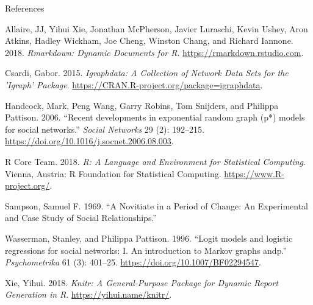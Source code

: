 \documentclass[10pt,ignorenonframetext,handout,aspectratio=169,]{beamer}
\begin{document}
\begin{frame}[allowframebreaks]{References}
\protect\hypertarget{references}{}

\hypertarget{refs}{}
\leavevmode\hypertarget{ref-rmarkdown}{}%
Allaire, JJ, Yihui Xie, Jonathan McPherson, Javier Luraschi, Kevin
Ushey, Aron Atkins, Hadley Wickham, Joe Cheng, Winston Chang, and
Richard Iannone. 2018. \emph{Rmarkdown: Dynamic Documents for R}.
\url{https://rmarkdown.rstudio.com}.

\leavevmode\hypertarget{ref-Csardi2015}{}%
Csardi, Gabor. 2015. \emph{Igraphdata: A Collection of Network Data Sets
for the 'Igraph' Package}.
\url{https://CRAN.R-project.org/package=igraphdata}.

\leavevmode\hypertarget{ref-Handcock2006}{}%
Handcock, Mark, Peng Wang, Garry Robins, Tom Snijders, and Philippa
Pattison. 2006. ``Recent developments in exponential random graph (p*)
models for social networks.'' \emph{Social Networks} 29 (2): 192--215.
\url{https://doi.org/10.1016/j.socnet.2006.08.003}.

\leavevmode\hypertarget{ref-R}{}%
R Core Team. 2018. \emph{R: A Language and Environment for Statistical
Computing}. Vienna, Austria: R Foundation for Statistical Computing.
\url{https://www.R-project.org/}.

\leavevmode\hypertarget{ref-sampson1969novitiate}{}%
Sampson, Samuel F. 1969. ``A Novitiate in a Period of Change: An
Experimental and Case Study of Social Relationships.''

\leavevmode\hypertarget{ref-Wasserman1996}{}%
Wasserman, Stanley, and Philippa Pattison. 1996. ``Logit models and
logistic regressions for social networks: I. An introduction to Markov
graphs andp.'' \emph{Psychometrika} 61 (3): 401--25.
\url{https://doi.org/10.1007/BF02294547}.

\leavevmode\hypertarget{ref-knitr}{}%
Xie, Yihui. 2018. \emph{Knitr: A General-Purpose Package for Dynamic
Report Generation in R}. \url{https://yihui.name/knitr/}.

\end{frame}
\end{document}
